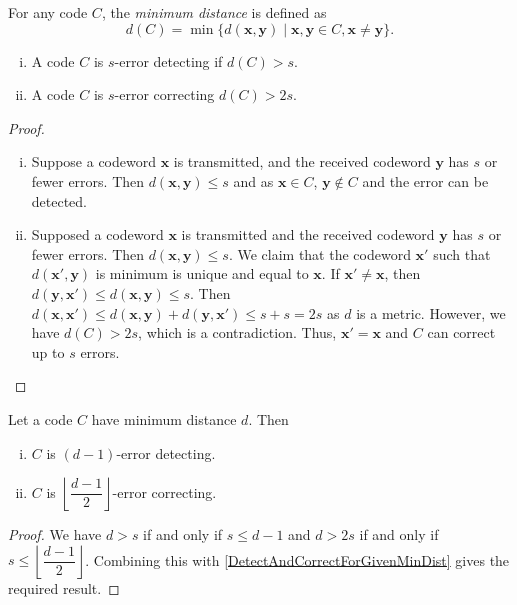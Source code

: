 \begin{definition}
    For any code $C$, the \textit{minimum distance} is defined as
    $$d(C)=\min\{d(\textbf{x},\textbf{y})\mid \textbf{x},\textbf{y}\in C, \textbf{x}\neq \textbf{y}\}.$$
\end{definition}

\begin{theorem}
\label{DetectAndCorrectForGivenMinDist}
\phantom{owo}
\begin{enumerate}[(i)]
    \item A code $C$ is $s$-error detecting if $d(C)>s$.
    \item A code $C$ is $s$-error correcting $d(C)>2s$.
\end{enumerate}
\end{theorem}
\begin{proof}
\phantom{uwu}
\begin{enumerate}[(i)]
    \item Suppose a codeword $\textbf{x}$ is transmitted, and the received codeword $\textbf{y}$ has $s$ or fewer errors. Then $d(\textbf{x},\textbf{y})\leq s$ and as $\textbf{x}\in C$, $\textbf{y}\not\in C$ and the error can be detected.
    \item Supposed a codeword $\textbf{x}$ is transmitted and the received codeword $\textbf{y}$ has $s$ or fewer errors. Then $d(\textbf{x},\textbf{y})\leq s$. We claim that the codeword $\textbf{x}'$ such that $d(\textbf{x}',\textbf{y})$ is minimum is unique and equal to $\textbf{x}$. If $\textbf{x}'\neq \textbf{x}$, then $d(\textbf{y},\textbf{x}')\leq d(\textbf{x},\textbf{y})\leq s$. Then $d(\textbf{x},\textbf{x}')\leq d(\textbf{x},\textbf{y})+d(\textbf{y},\textbf{x}')\leq s+s=2s$ as $d$ is a metric. However, we have $d(C)>2s$, which is a contradiction. Thus, $\textbf{x}'=\textbf{x}$ and $C$ can correct up to $s$ errors.
\end{enumerate}
\end{proof}

\begin{corollary}
    Let a code $C$ have minimum distance $d$. Then
    \begin{enumerate}[(i)]
        \item $C$ is $(d-1)$-error detecting.
        \item $C$ is $\left\lfloor{\dfrac{d-1}{2}}\right\rfloor$-error correcting.
    \end{enumerate}
\end{corollary}
\begin{proof}
    We have $d>s$ if and only if $s\leq d-1$ and $d>2s$ if and only if $s\leq \left\lfloor\dfrac{d-1}{2}\right\rfloor$. Combining this with \ref{DetectAndCorrectForGivenMinDist} gives the required result.
\end{proof}

